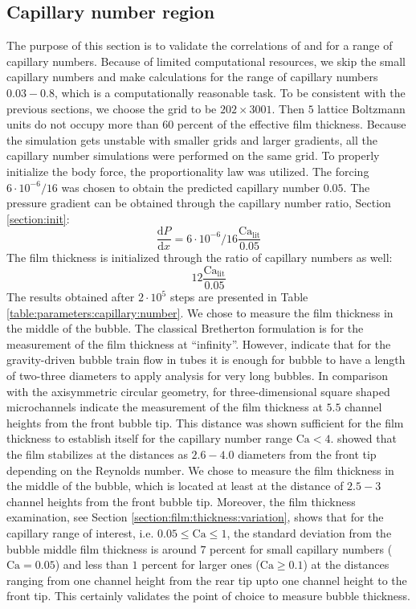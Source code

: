 \documentclass[preprint,12pt]{elsarticle}
\newcommand{\Ca}{\mathrm{Ca}}
\begin{document}
\subsection{Capillary number region}
\label{section:capillary:range}
The purpose of this section is to validate the correlations of
\citet{giavedoni-numerical} %
and
\citet{heil-bretherton} %
for a range of capillary
numbers. Because of limited computational resources, we skip the
small capillary numbers and make calculations for the range of capillary numbers $0.03-0.8$, which
is a computationally reasonable task.  To be consistent with the previous sections, we choose the grid to be
$202 \times 3001$. Then $5$ lattice Boltzmann units do not occupy more than $60$
percent of the effective film thickness. Because the simulation gets unstable with
smaller grids and larger gradients, all the capillary number simulations were
performed on the same grid. To properly initialize the body force, the
proportionality law was utilized. The forcing
$6 \cdot 10^{-6}/16$ was chosen to obtain the predicted capillary
number $0.05$.  
The pressure gradient can be obtained through the capillary number
ratio, Section \ref{section:init}:
\begin{equation}
\frac{\mathrm{d}P}{\mathrm{d} x}=6 \cdot 10^{-6}/16 \frac{\Ca_{\mathrm{lit}}}{0.05}
\end{equation}
The film thickness is initialized through the ratio of capillary numbers as well:
\begin{equation*}
12 \frac{\Ca_{\mathrm{lit}}}{0.05}
\end{equation*}
The results obtained after $2\cdot10^5$ steps are presented in Table
\ref{table:parameters:capillary:number}. 
{\color{red} We chose to measure the film thickness in the middle of the bubble. The
classical Bretherton formulation is for the measurement of the film thickness at ``infinity''.
However, \citet{cerro-bubble-train} indicate that for the gravity-driven bubble train flow in tubes
it is enough for bubble to have a length of two-three diameters to apply analysis for very long
bubbles. In comparison with the axisymmetric circular geometry, for three-dimensional square shaped
microchannels \citet{heil-threedim} indicate the measurement of the film thickness at $5.5$
channel heights from the front bubble tip. This distance was shown sufficient for the
film thickness to establish itself for the capillary number range $\Ca<4$.
\citet{giavedoni-numerical} showed that the film stabilizes at the distances as $2.6-4.0$ diameters
from the front tip depending on the Reynolds number.  We chose to measure the film thickness in the
middle of the bubble, which is located at least at the distance of $2.5-3$ channel heights from the
front bubble tip. Moreover, the film thickness examination, see Section
\ref{section:film:thickness:variation}, shows that for the capillary range of interest, i.e.
$0.05\leq \Ca \leq 1$, the standard deviation from the bubble middle film thickness is around $7$
percent for small capillary numbers ($\Ca=0.05$) and less than $1$ percent for larger ones ($\Ca
\geq 0.1$) at the distances ranging from one channel height from the rear tip upto one channel
height to the front tip. This certainly validates the point of choice to measure bubble thickness.}
\end{document}
